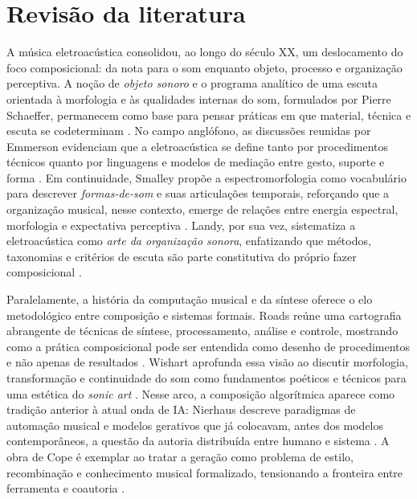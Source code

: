 \section{Revisão da literatura}

A música eletroacústica consolidou, ao longo do século XX, um deslocamento do foco composicional: da nota para o som enquanto objeto, processo e organização perceptiva. A noção de \emph{objeto sonoro} e o programa analítico de uma escuta orientada à morfologia e às qualidades internas do som, formulados por Pierre Schaeffer, permanecem como base para pensar práticas em que material, técnica e escuta se codeterminam \cite{schaeffer1966traite}. No campo anglófono, as discussões reunidas por Emmerson evidenciam que a eletroacústica se define tanto por procedimentos técnicos quanto por linguagens e modelos de mediação entre gesto, suporte e forma \cite{emmerson1986language}. Em continuidade, Smalley propõe a espectromorfologia como vocabulário para descrever \emph{formas-de-som} e suas articulações temporais, reforçando que a organização musical, nesse contexto, emerge de relações entre energia espectral, morfologia e expectativa perceptiva \cite{smalley1997spectromorphology}. Landy, por sua vez, sistematiza a eletroacústica como \emph{arte da organização sonora}, enfatizando que métodos, taxonomias e critérios de escuta são parte constitutiva do próprio fazer composicional \cite{landy2007soundorganization}.

Paralelamente, a história da computação musical e da síntese oferece o elo metodológico entre composição e sistemas formais. Roads reúne uma cartografia abrangente de técnicas de síntese, processamento, análise e controle, mostrando como a prática composicional pode ser entendida como desenho de procedimentos e não apenas de resultados \cite{roads1996computermusictutorial}. Wishart aprofunda essa visão ao discutir morfologia, transformação e continuidade do som como fundamentos poéticos e técnicos para uma estética do \emph{sonic art} \cite{wishart1996sonicart}. Nesse arco, a composição algorítmica aparece como tradição anterior à atual onda de IA: Nierhaus descreve paradigmas de automação musical e modelos gerativos que já colocavam, antes dos modelos contemporâneos, a questão da autoria distribuída entre humano e sistema \cite{nierhaus2009algorithmiccomposition}. A obra de Cope é exemplar ao tratar a geração como problema de estilo, recombinação e conhecimento musical formalizado, tensionando a fronteira entre ferramenta e coautoria \cite{cope1996emi}.

